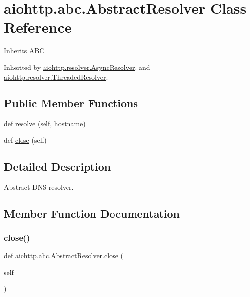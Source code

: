 \hypertarget{classaiohttp_1_1abc_1_1_abstract_resolver}{}\section{aiohttp.\+abc.\+Abstract\+Resolver Class Reference}
\label{classaiohttp_1_1abc_1_1_abstract_resolver}


Inherits A\+BC.



Inherited by \hyperlink{classaiohttp_1_1resolver_1_1_async_resolver}{aiohttp.\+resolver.\+Async\+Resolver}, and \hyperlink{classaiohttp_1_1resolver_1_1_threaded_resolver}{aiohttp.\+resolver.\+Threaded\+Resolver}.

\subsection*{Public Member Functions}
\begin{DoxyCompactItemize}
\item 
def \hyperlink{classaiohttp_1_1abc_1_1_abstract_resolver_a9f3621d4f63c3b864bab7084bbff453f}{resolve} (self, hostname)
\item 
def \hyperlink{classaiohttp_1_1abc_1_1_abstract_resolver_a857a3f04577902e48d1470109989462e}{close} (self)
\end{DoxyCompactItemize}


\subsection{Detailed Description}
\begin{DoxyVerb}Abstract DNS resolver.\end{DoxyVerb}
 

\subsection{Member Function Documentation}
\mbox{\label{classaiohttp_1_1abc_1_1_abstract_resolver_a857a3f04577902e48d1470109989462e}} 
\subsubsection{\texorpdfstring{close()}{close()}}
{\footnotesize\ttfamily def aiohttp.\+abc.\+Abstract\+Resolver.\+close (\begin{DoxyParamCaption}\item[{}]{self }\end{DoxyParamCaption})}

